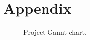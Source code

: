 \section{Appendix}
\label{sec:appendix}
\begin{figure}
    \centering
    
    \caption{Project Gannt chart.}
    \label{fig:gantt}
\end{figure}

